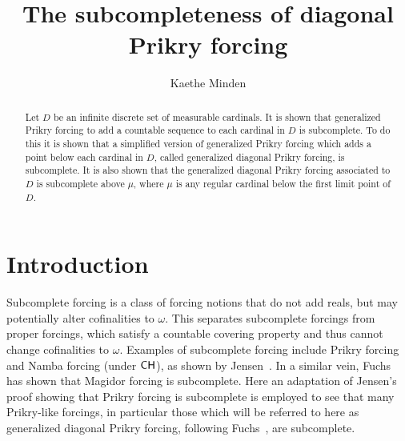 \documentclass{amsart}
\theoremstyle{definition}
\theoremstyle{remark}
\newcommand{\CH}{\textup{\textsf{CH}}}
\begin{document}
\title{The subcompleteness of diagonal Prikry forcing}

\author{Kaethe Minden}
 \address[K.~Minden]{Mathematics, Marlboro College, 2582 South Road, Marlboro, VT 05344}
\date{}     					

\begin{abstract}
Let \(D\) be an infinite discrete set of measurable cardinals. It is shown that generalized Prikry forcing to add a countable sequence to each cardinal in \(D\) is subcomplete. To do this it is shown that a simplified version of generalized Prikry forcing which adds a point below each cardinal in \(D\), called generalized diagonal Prikry forcing, is subcomplete. It is also shown that the generalized diagonal Prikry forcing associated to \(D\) is subcomplete above $\mu$, where $\mu$ is any regular cardinal below the first limit point of \(D\).
\end{abstract}
\maketitle

\section{Introduction}
Subcomplete forcing is a class of forcing notions that do not add reals, but may potentially alter cofinalities to $\omega$. 
This separates subcomplete forcings from proper forcings, which satisfy a countable covering property and thus cannot change cofinalities to $\omega$. 
Examples of subcomplete forcing include Prikry forcing and Namba forcing (under $\CH$), as shown by Jensen~\cite[Section 3.3]{Jensen:2012fr}. 
In a similar vein, Fuchs~\cite{Fuchs:2017Magidor} has shown that Magidor forcing is subcomplete. Here an adaptation of Jensen's proof showing that Prikry forcing is subcomplete is employed to see that many Prikry-like forcings, in particular those which will be referred to here as generalized diagonal Prikry forcing, following Fuchs~\cite{Fuchs:2005kx}, are subcomplete.
\end{document}
